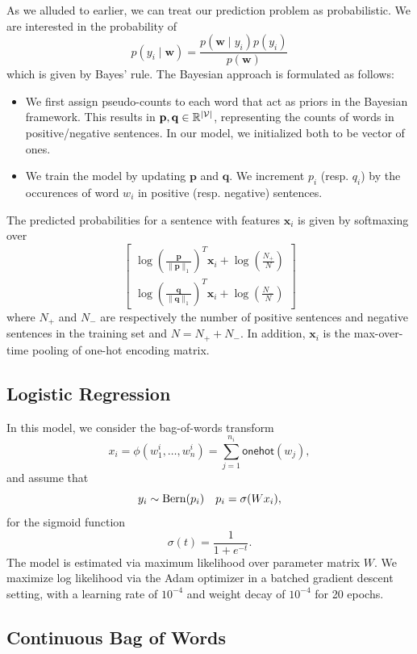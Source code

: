 \documentclass[11pt]{article}
\begin{document}
As we alluded to earlier, we can treat our prediction problem as probabilistic. We are interested in the probability of
\[
  p(y_i \mid \bm w) = \frac{p(\bm w \mid y_i) p(y_i)}{p(\bm w)}
\]
which is given by Bayes' rule. The Bayesian approach is formulated as follows:
\newcommand{\bdp}{\mathbf{p}}
\newcommand{\bdq}{\mathbf{q}}
\begin{itemize}
  \item We first assign pseudo-counts to each word that act as priors in the Bayesian framework. This results in $\bdp, \bdq \in \mathbb{R}^{|\mcV|}$, representing the counts of words in positive/negative sentences. In our model, we initialized both to be vector of ones.
  \item We train the model by updating $\bdp$ and $\bdq$. We increment $p_i$ (resp. $q_i$) by the occurences of word $w_i$ in positive (resp. negative) sentences.
\end{itemize}
The predicted probabilities for a sentence with features $\bm x_i$ is given by softmaxing over
\[
  \begin{bmatrix}
    \log \left( \frac{\bdp}{\|\bdp\|_1} \right)^T \bm x_i + \log \left( \frac{N_+}{N} \right)\\
    \log \left( \frac{\bdq}{\|\bdq\|_1} \right)^T \bm x_i + \log \left( \frac{N_-}{N} \right)
  \end{bmatrix}
\]
where $N_+$ and $N_-$ are respectively the number of positive sentences and negative sentences in the training set and $N = N_+ + N_-$. In addition, $\bm x_i$ is the max-over-time pooling of one-hot encoding matrix.

\subsection{Logistic Regression}
\label{subsec:logistic}

In this model,  we consider the bag-of-words transform \[x_i = \phi
(w_1^i,\ldots,w_n^i) =
\sum_{j=1}^{n_i} \mathsf{onehot}(w_j),\] and assume that \[
y_i \sim \operatorname{Bern}(p_i) \quad p_i = \sigma(Wx_i),
\]
for the sigmoid function \[
\sigma(t) = \frac{1}{1+e^{-t}}. 
\]
The model is estimated via maximum likelihood over parameter matrix $W$. We
maximize log likelihood via the Adam optimizer in a batched gradient descent
setting, with a learning rate of $10^{-4}$
and weight decay of $10^{-4}$ for 20 epochs. 



\subsection{Continuous Bag of Words}
\label{subsec:cbow}
\end{document}
